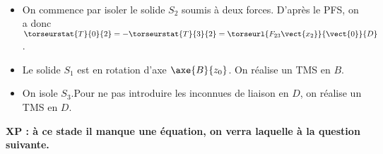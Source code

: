 \ifprof
\begin{corrige}~\\
\begin{itemize}
\item On commence par isoler le solide $S_2$ soumis à deux forces. D'après le PFS, on a donc $\torseurstat{T}{0}{2}=-\torseurstat{T}{3}{2}=\torseurl{F_{23}\vect{x_2}}{\vect{0}}{D}$.
\item Le solide $S_1$ est en rotation d'axe $\axe{B}{z_0}$. On réalise un TMS en $B$.
\item On isole $S_3$.Pour ne pas introduire les inconnues de liaison en $D$, on réalise un TMS en $D$.
\end{itemize}

\textbf{XP : à ce stade il manque une équation, on verra laquelle à la question suivante.}
\end{corrige}
\else
\fi
\else
\fi


